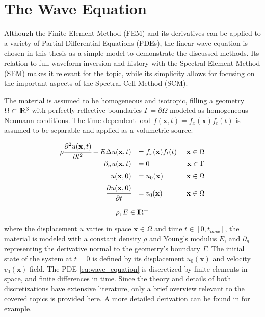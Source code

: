%
\section{The Wave Equation}
\label{section:wave_equation}
%

Although the Finite Element Method (FEM) and its derivatives can be applied to a variety of Partial Differential Equations (PDEs), the linear wave equation is chosen in this thesis as a simple model to demonstrate the discussed methods.
Its relation to full waveform inversion \cite{Zhang2013} and history with the Spectral Element Method (SEM) \cite{Maggio1994} makes it relevant for the topic, while its simplicity allows for focusing on the important aspects of the Spectral Cell Method (SCM).

The material is assumed to be homogeneous and isotropic, filling a geometry $\Omega \subset \rm I\!R^3$ with perfectly reflective boundaries $\Gamma = \partial \Omega$ modeled as homogeneous Neumann conditions. The time-dependent load $f(\mathbf x, t)=f_x(\mathbf x)f_t(t)$ is assumed to be separable and applied as a volumetric source.

\begin{equation} \label{eq:wave_equation}
	\begin{array}{rlr}
		\rho \cfrac{\partial^2 u(\mathbf x,t)}{\partial t^2} - E \Delta u(\mathbf x, t) &= f_x(\mathbf x) f_t(t)
		& \ \mathbf x \in \Omega \\[0.5em]
		\partial_n u(\mathbf x, t) &= 0
		& \mathbf x \in \Gamma \\[0.5em]
		u(\mathbf x, 0) &= u_0(\mathbf x)
		& \ \mathbf x \in \Omega \\[0.5em]
		\cfrac{\partial u(\mathbf x, 0)}{\partial t} &= v_0(\mathbf x)
		& \ \mathbf x \in \Omega \\
	\end{array}
\end{equation}

\begin{equation}
	\rho, E \in \rm I\!R^+
\end{equation}

where the displacement $u$ varies in space $\mathbf x \in \Omega$ and time $t \in [0,t_{max}]$, the material is modeled with a constant density $\rho$ and Young's modulus $E$, and $\partial_n$ representing the derivative normal to the geometry's boundary $\Gamma$. The initial state of the system at $t=0$ is defined by its displacement $u_0(\mathbf x)$ and velocity $v_0(\mathbf x)$ field.
The PDE \ref{eq:wave_equation} is discretized by finite elements in space, and finite differences in time. Since the theory and details of both discretizations have extensive literature, only a brief overview relevant to the covered topics is provided here. A more detailed derivation can be found in \cite{Larson2013} for example.

